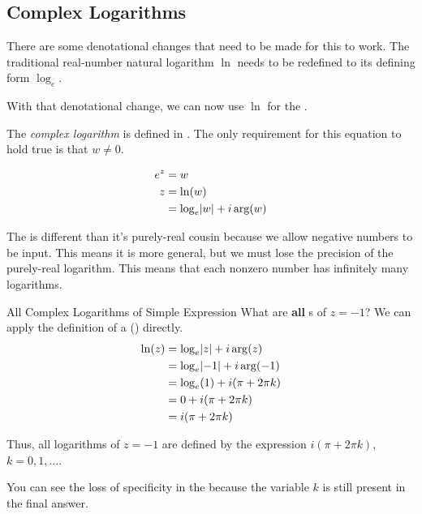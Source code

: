 \subsection{Complex Logarithms}\label{subsec:Complex_Logarithms}
There are some denotational changes that need to be made for this to work.
The traditional real-number natural logarithm $\ln$ needs to be redefined to its defining form $\log_{e}$.

With that denotational change, we can now use $\ln$ for the .

\begin{definition}\label{def:Complex_Logarithm}
  The \emph{complex logarithm} is defined in .
  The only requirement for this equation to hold true is that $w \neq 0$.

  \begin{equation}\label{eq:Complex_Logarithm}
    \begin{aligned}
      e^{z} &= w \\
      z &= \ln(w) \\
      &= \log_{e} \lvert w \rvert + i \arg(w)
    \end{aligned}
  \end{equation}

  \begin{remark}
    The  is different than it's purely-real cousin because we allow negative numbers to be input.
    This means it is more general, but we must lose the precision of the purely-real logarithm.
    This means that each nonzero number has infinitely many logarithms.
  \end{remark}
\end{definition}

\begin{example}[Lecture 3]{All Complex Logarithms of Simple Expression}
  What are \textbf{all} s of $z = -1$?
  \tcblower{}
  We can apply the definition of a  () directly.
  \begin{align*}
    \ln(z) &= \log_{e} \lvert z \rvert + i \arg(z) \\
           &= \log_{e} \lvert -1 \rvert + i \arg(-1) \\
           &= \log_{e} (1) + i (\pi + 2 \pi k) \\
           &= 0 + i (\pi + 2 \pi k) \\
           &= i (\pi + 2 \pi k)
  \end{align*}

  Thus, all logarithms of $z = -1$ are defined by the expression $i (\pi + 2 \pi k)$, $k = 0, 1, \ldots$.

  \begin{remark*}
    You can see the loss of specificity in the  because the variable $k$ is still present in the final answer.
  \end{remark*}
\end{example}


